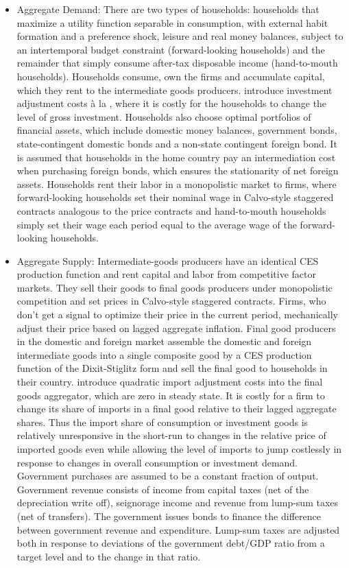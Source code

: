 \documentclass[11pt,a4paper]{article}
\begin{document}
	\begin{itemize}
		\item Aggregate Demand: There are two types of households: households that maximize a utility function separable in consumption, with external habit formation and a preference shock, leisure and real money balances, subject to an intertemporal budget constraint (forward-looking households) and the remainder that simply consume after-tax disposable income (hand-to-mouth households). Households consume, own the firms and accumulate capital, which they rent to the intermediate goods producers. \cite{ErcegGuerrieriGust2008} introduce investment adjustment costs \`{a} la \cite{ChristianoEichenbaumEvans2005}, where it is costly for the households to change the level of gross investment. Households also choose optimal portfolios of financial assets, which include domestic money balances, government bonds, state-contingent domestic bonds and a non-state contingent foreign bond. It is assumed that households in the home country pay an intermediation cost when purchasing foreign bonds, which ensures the stationarity of net foreign assets. Households rent their labor in a monopolistic market to firms, where forward-looking households set their nominal wage in Calvo-style staggered contracts analogous to the price contracts and hand-to-mouth households simply set their wage each period equal to the average wage of the forward-looking households.
		\item Aggregate Supply: Intermediate-goods producers have an identical CES production function and rent capital and labor from competitive factor markets. They sell their goods to final goods producers under monopolistic competition and set prices in Calvo-style staggered contracts. Firms, who don't get a signal to optimize their price in the current period, mechanically adjust their price based on lagged aggregate inflation. Final good producers in the domestic and foreign market assemble the domestic and foreign intermediate goods into a single composite good by a CES production function of the Dixit-Stiglitz form and sell the final good to households in their country. \cite{ErcegGuerrieriGust2008} introduce quadratic import adjustment costs into the final goods aggregator, which are zero in steady state. It is costly for a firm to change its share of imports in a final good relative to their lagged aggregate shares. Thus the import share of consumption or investment goods is relatively unresponsive in the short-run to changes in the relative price of imported goods even while allowing the level of imports to jump costlessly in response to changes in overall consumption or investment demand. Government purchases are assumed to be a constant fraction of output. Government revenue consists of income from capital taxes (net of the depreciation write off), seignorage income and revenue from lump-sum taxes (net of transfers). The government issues bonds to finance the difference between government revenue and expenditure. Lump-sum taxes are adjusted both in response to deviations of the government debt/GDP ratio from a target level and to the change in that ratio.
		

\end{itemize}
\end{document}

